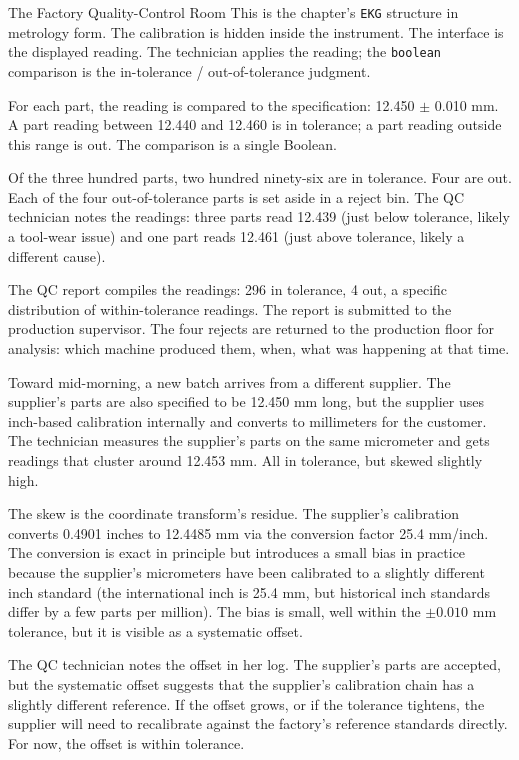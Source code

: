 \begin{coda}{The Factory Quality-Control Room}
This is the chapter's \texttt{EKG} structure in metrology form. The
calibration is hidden inside the instrument. The interface is the
displayed reading. The technician applies the reading; the
\texttt{boolean} comparison is the in-tolerance / out-of-tolerance
judgment.

For each part, the reading is compared to the specification: 12.450
$\pm$ 0.010 mm. A part reading between 12.440 and 12.460 is in
tolerance; a part reading outside this range is out. The comparison
is a single Boolean.

Of the three hundred parts, two hundred ninety-six are in tolerance.
Four are out. Each of the four out-of-tolerance parts is set aside in
a reject bin. The QC technician notes the readings: three parts read
12.439 (just below tolerance, likely a tool-wear issue) and one part
reads 12.461 (just above tolerance, likely a different cause).

The QC report compiles the readings: 296 in tolerance, 4 out, a
specific distribution of within-tolerance readings. The report is
submitted to the production supervisor. The four rejects are returned
to the production floor for analysis: which machine produced them,
when, what was happening at that time.

Toward mid-morning, a new batch arrives from a different supplier.
The supplier's parts are also specified to be 12.450 mm long, but the
supplier uses inch-based calibration internally and converts to
millimeters for the customer. The technician measures the supplier's
parts on the same micrometer and gets readings that cluster around
12.453 mm. All in tolerance, but skewed slightly high.

The skew is the coordinate transform's residue. The supplier's
calibration converts 0.4901 inches to 12.4485 mm via the conversion
factor 25.4 mm/inch. The conversion is exact in principle but
introduces a small bias in practice because the supplier's micrometers
have been calibrated to a slightly different inch standard (the
international inch is 25.4 mm, but historical inch standards differ
by a few parts per million). The bias is small, well within the
$\pm 0.010$ mm tolerance, but it is visible as a systematic offset.

The QC technician notes the offset in her log. The supplier's parts
are accepted, but the systematic offset suggests that the supplier's
calibration chain has a slightly different reference. If the offset
grows, or if the tolerance tightens, the supplier will need to
recalibrate against the factory's reference standards directly. For
now, the offset is within tolerance.


\end{coda}
